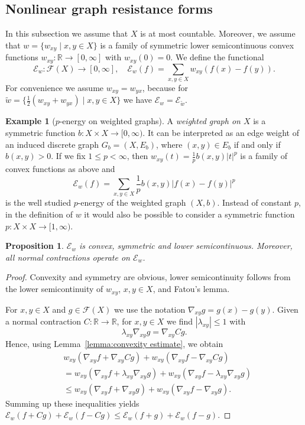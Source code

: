 \documentclass[a4paper,11pt,reqno]{amsart}
\newtheorem{proposition}[lemma]{Proposition}
\theoremstyle{definition}
\newtheorem{example}[lemma]{Example}
\numberwithin{equation}{section}
\newcommand{\cE}{{\mathcal E}}
\newcommand{\cF}{{\mathcal F}}
\newcommand{\R}{{\mathbb R}}
\newcommand{\1}{\mathds{1}}
\begin{document}
 




\subsection{Nonlinear graph resistance forms}

In this subsection we assume that $X$ is at most countable. Moreover, we assume that $w = \{w_{xy} \mid x,y \in X\}$ is a family of symmetric lower semicontinuous convex functions $w_{xy} \colon \R \to [0,\infty]$ with $w_{xy}(0) = 0$. We define the  functional 
%
$$\cE_w \colon \cF(X) \to [0,\infty], \quad \cE_w(f) = \sum_{x,y \in X} w_{xy}(f(x) - f(y)).$$
%
For convenience we assume $w_{xy} = w_{yx}$, because for  $\tilde w = \{\frac{1}{2} (w_{xy} + w_{yx}) \mid x,y \in X\}$ we have $\cE_w = \cE_{\tilde w}$. 




\begin{example}[$p$-energy on weighted graphs] \label{example:p energy}
 A {\em weighted graph on $X$} is  a symmetric function $b \colon X \times X \to [0,\infty)$. It can be interpreted as an edge weight of an induced discrete graph $G_b = (X,E_b)$, where $(x,y) \in E_b$ if and only if $b(x,y) > 0$.  If we fix $1 \leq p < \infty$, then $w_{xy}(t) = \frac{1}{p} b(x,y) |t|^p$ is a family of convex functions as above and 
 $$\cE_w(f) = \sum_{x,y \in X}  \frac{1}{p} b(x,y)|f(x) - f(y)|^p$$
 is the well studied $p$-energy of the weighted graph $(X,b)$. Instead of constant $p$,  in the definition of $w$ it would also be possible to consider a symmetric function $p \colon X \times X \to [1,\infty)$. 
\end{example}




\begin{proposition}\label{proposition:graph resistance forms}
  $\cE_w$ is convex, symmetric and  lower semicontinuous. Moreover, all normal contractions operate on $\cE_w$. 
\end{proposition}
 \begin{proof}
  Convexity and symmetry are obvious, lower semicontinuity follows from the lower semicontinuity of $w_{xy}$, $x,y \in X$, and Fatou's lemma.
  
  For $x,y \in X$ and $g \in \cF(X)$ we use the notation $\nabla_{xy} g = g(x) - g(y)$. Given a normal contraction  $C \colon \R \to \R$, for $x,y \in X$ we find $|\lambda_{xy}| \leq 1$ with 
  $$\lambda_{xy} \nabla_{xy} g =  \nabla_{xy}  Cg.$$
  Hence, using Lemma~\ref{lemma:convexity estimate}, we obtain 
  \begin{align*}
   &w_{xy} (\nabla_{xy}f  + \nabla_{xy}Cg ) + w_{xy} (\nabla_{xy}f  - \nabla_{xy}Cg)\\
   &= w_{xy} (\nabla_{xy}f  + \lambda_{xy} \nabla_{xy}g ) + w_{xy} (\nabla_{xy}f  - \lambda_{xy} \nabla_{xy}g)\\
   &\leq w_{xy} (\nabla_{xy}f  +  \nabla_{xy}g ) + w_{xy} (\nabla_{xy}f  -\nabla_{xy}g).
  \end{align*}
 Summing up these inequalities yields $\cE_w(f + Cg) + \cE_w(f-Cg) \leq \cE_w(f + g) + \cE_w(f-g)$. 
 \end{proof}
\end{document}
